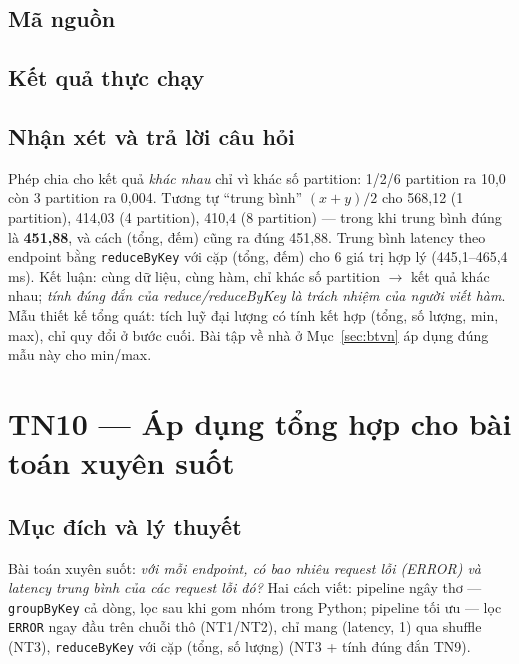\documentclass[12pt,a4paper,oneside]{article}
\begin{document}
\subsection{Mã nguồn}



\subsection{Kết quả thực chạy}



\subsection{Nhận xét và trả lời câu hỏi}

Phép chia cho kết quả \emph{khác nhau} chỉ vì khác số partition: 1/2/6 partition ra 10,0 còn 3 partition ra 0,004. Tương tự ``trung bình'' $(x+y)/2$ cho 568,12 (1 partition), 414,03 (4 partition), 410,4 (8 partition) --- trong khi trung bình đúng là \textbf{451,88}, và cách (tổng, đếm) cũng ra đúng 451,88. Trung bình latency theo endpoint bằng \texttt{reduceByKey} với cặp (tổng, đếm) cho 6 giá trị hợp lý (445,1--465,4 ms). Kết luận: cùng dữ liệu, cùng hàm, chỉ khác số partition $\to$ kết quả khác nhau; \emph{tính đúng đắn của reduce/reduceByKey là trách nhiệm của người viết hàm}. Mẫu thiết kế tổng quát: tích luỹ đại lượng có tính kết hợp (tổng, số lượng, min, max), chỉ quy đổi ở bước cuối. Bài tập về nhà ở Mục~\ref{sec:btvn} áp dụng đúng mẫu này cho min/max.

\section{TN10 --- Áp dụng tổng hợp cho bài toán xuyên suốt}
\label{sec:tn10}

\subsection{Mục đích và lý thuyết}

Bài toán xuyên suốt: \emph{với mỗi endpoint, có bao nhiêu request lỗi (ERROR) và latency trung bình của các request lỗi đó?} Hai cách viết: pipeline ngây thơ --- \texttt{groupByKey} cả dòng, lọc sau khi gom nhóm trong Python; pipeline tối ưu --- lọc \texttt{ERROR} ngay đầu trên chuỗi thô (NT1/NT2), chỉ mang (latency, 1) qua shuffle (NT3), \texttt{reduceByKey} với cặp (tổng, số lượng) (NT3 + tính đúng đắn TN9).
\end{document}

